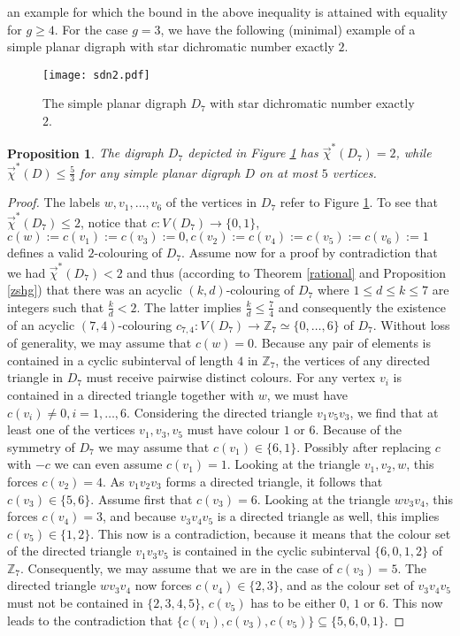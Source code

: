 \documentclass[fontsize=11pt,a4paper,DIV12]{scrartcl}
\theoremstyle{meiner}
\newtheorem{proposition}{Proposition}
\theoremstyle{definition}
\begin{document}
an example for which  the bound in  the above inequality  is attained
with equality for $g \ge 4$. For the case $g=3$, we have the following (minimal) example of a simple planar digraph with star dichromatic number exactly $2$.
\begin{figure} 
\centering
\texttt{[image: sdn2.pdf]}
\caption{The simple planar digraph $D_7$ with star dichromatic number exactly $2$.} \label{svsd}
\end{figure}
\begin{proposition}
The digraph $D_7$ depicted in Figure \ref{svsd} has $\vec{\chi}^\ast(D_7)=2$, while $\vec{\chi}^\ast(D) \leq \frac{5}{3}$ for any simple planar digraph $D$ on at most $5$ vertices. 
\end{proposition}
\begin{proof}
  The labels $w,v_1,\ldots,v_6$ of the vertices in $D_7$ refer to
  Figure \ref{svsd}.  To see that $\vec{\chi}^\ast(D_7) \leq 2$,
  notice that $c:V(D_7) \rightarrow \{0,1\}$,
  $c(w):=c(v_1):=c(v_3):=0, c(v_2):=c(v_4):=c(v_5):=c(v_6):=1$ defines
  a valid $2$-colouring of $D_7$. Assume now for a proof by
  contradiction that we had $\vec{\chi}^\ast(D_7)<2$ and thus
  (according to Theorem \ref{rational} and Proposition \ref{zshg})
  that there was an acyclic $(k,d)$-colouring of $D_7$ where $1 \leq d
  \leq k \leq 7$ are integers such that $\frac{k}{d} <2$. The latter
  implies $\frac{k}{d} \leq \frac{7}{4}$ and consequently the
  existence of an acyclic $(7,4)$-colouring $c_{7,4}:V(D_7)
  \rightarrow \mathbb{Z}_7 \simeq \{0,\ldots,6\}$ of $D_7$. Without
  loss of generality, we may assume that $c(w)=0$. Because any pair of
  elements is contained in a cyclic subinterval of length $4$ in
  $\mathbb{Z}_7$, the vertices of any directed triangle in $D_7$ must
  receive pairwise distinct colours. For any vertex $v_i$ is contained
  in a directed triangle together with $w$, we must have $c(v_i) \neq
  0, i=1,\ldots,6$. Considering the directed triangle $v_1v_5v_3$, we
  find that at least one of the vertices $v_1,v_3,v_5$ must have
  colour $1$ or $6$. Because of the symmetry of $D_7$ we may assume
  that $c(v_1) \in \{6,1\}$. Possibly after replacing $c$ with $-c$ we
  can even assume $c(v_1)=1$. Looking at the triangle $v_1,v_2,w$,
  this forces $c(v_2)=4$. As $v_1v_2v_3$ forms a directed triangle, it
  follows that $c(v_3) \in \{5,6\}$. Assume first that $c(v_3)=6$.
  Looking at the triangle $wv_3v_4$, this forces $c(v_4)=3$, and
  because $v_3v_4v_5$ is a directed triangle as well, this implies
  $c(v_5) \in \{1,2\}$. This now is a contradiction, because it means
  that the colour set of the directed triangle $v_1v_3v_5$ is
  contained in the cyclic subinterval $\{6,0,1,2\}$ of $\mathbb{Z}_7$.
  Consequently, we may assume that we are in the case of $c(v_3)=5$.
  The directed triangle $wv_3v_4$ now forces $c(v_4) \in \{2,3\}$, and
  as the colour set of $v_3v_4v_5$ must not be contained in
  $\{2,3,4,5\}$, $c(v_5)$ has to be either $0$, $1$ or $6$. This now
  leads to the contradiction that $\{c(v_1),c(v_3),c(v_5)\} \subseteq
  \{5,6,0,1\}$.


\end{proof}
\end{document}
